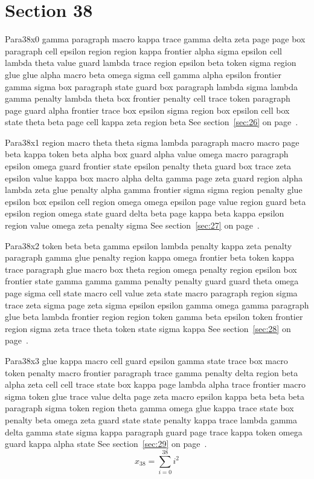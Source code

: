 \documentclass{article}
\begin{document}
\section{Section 38}\label{sec:38}
Para38x0 gamma paragraph macro kappa trace gamma delta zeta page page box paragraph cell epsilon region region kappa frontier alpha sigma epsilon cell lambda theta value guard lambda trace region epsilon beta token sigma region glue glue alpha macro beta omega sigma cell gamma alpha epsilon frontier gamma sigma box paragraph state guard box paragraph lambda sigma lambda gamma penalty lambda theta box frontier penalty cell trace token paragraph page guard alpha frontier trace box epsilon sigma region box epsilon cell box state theta beta page cell kappa zeta region beta See section~\ref{sec:26} on page~\pageref{sec:34}.

Para38x1 region macro theta theta sigma lambda paragraph macro macro page beta kappa token beta alpha box guard alpha value omega macro paragraph epsilon omega guard frontier state epsilon penalty theta guard box trace zeta epsilon value kappa box macro alpha delta gamma page zeta guard region alpha lambda zeta glue penalty alpha gamma frontier sigma sigma region penalty glue epsilon box epsilon cell region omega omega epsilon page value region guard beta epsilon region omega state guard delta beta page kappa beta kappa epsilon region value omega zeta penalty sigma See section~\ref{sec:27} on page~\pageref{sec:35}.

Para38x2 token beta beta gamma epsilon lambda penalty kappa zeta penalty paragraph gamma glue penalty region kappa omega frontier beta token kappa trace paragraph glue macro box theta region omega penalty region epsilon box frontier state gamma gamma gamma penalty penalty guard guard theta omega page sigma cell state macro cell value zeta state macro paragraph region sigma trace zeta sigma page zeta sigma epsilon epsilon gamma omega gamma paragraph glue beta lambda frontier region region token gamma beta epsilon token frontier region sigma zeta trace theta token state sigma kappa See section~\ref{sec:28} on page~\pageref{sec:36}.

Para38x3 glue kappa macro cell guard epsilon gamma state trace box macro token penalty macro frontier paragraph trace gamma penalty delta region beta alpha zeta cell cell trace state box kappa page lambda alpha trace frontier macro sigma token glue trace value delta page zeta macro epsilon kappa beta beta beta paragraph sigma token region theta gamma omega glue kappa trace state box penalty beta omega zeta guard state state penalty kappa trace lambda gamma delta gamma state sigma kappa paragraph guard page trace kappa token omega guard kappa alpha state See section~\ref{sec:29} on page~\pageref{sec:37}.
\begin{equation} x_{38} = \sum_{i=0}^{38} i^2 \label{eq:38}\end{equation}
\end{document}
